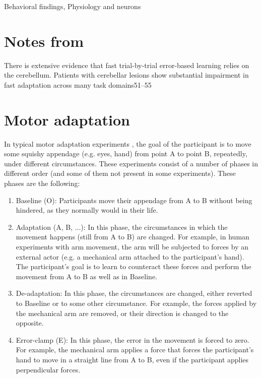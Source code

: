 \documentclass{report}
\begin{document}
\begin{chapter}{Behavioral findings, Physiology and neurons}
\section{Notes from }
There is extensive evidence that fast trial-by-trial error-based learning relies on the cerebellum. Patients with cerebellar lesions show substantial impairment in fast adaptation across many task domains51–55

\section{Motor adaptation}
In typical motor adaptation experiments \citep[e.g.][]{Medina_Mechanism_2001,
  Davidson_Scaling_2004,Kojima_Memory_2004}, the goal of the participant is to
move some squishy appendage (e.g. eyes, hand) from point A to point B,
repeatedly, under different circumstances. These experiments consist of a
number of phases in different order (and some of them not present in some
experiments). These phases are the following:
\begin{enumerate}
\item Baseline (O): Participants move their appendage from A to B without being
hindered, as they normally would in their life.
\item Adaptation (A, B, ...): In this phase, the circumstances in which the movement
happens (still from A to B) are changed. For example, in human experiments with
arm movement, the arm will be subjected to forces by an external actor (e.g. a
mechanical arm attached to the participant's hand). The participant's goal is
to learn to counteract these forces and perform the movement from A to B as
well as in Baseline.
\item De-adaptation: In this phase, the circumstances are changed, either
reverted to Baseline or to some other circumstance. For example, the forces
applied by the mechanical arm are removed, or their direction is changed to the
opposite.
\item Error-clamp (E): In this phase, the error in the movement is forced to
zero. For example, the mechanical arm applies a force that forces the
participant's hand to move in a straight line from A to B, even if the
participant applies perpendicular forces.
\end{enumerate}


\end{chapter}
\end{document}
